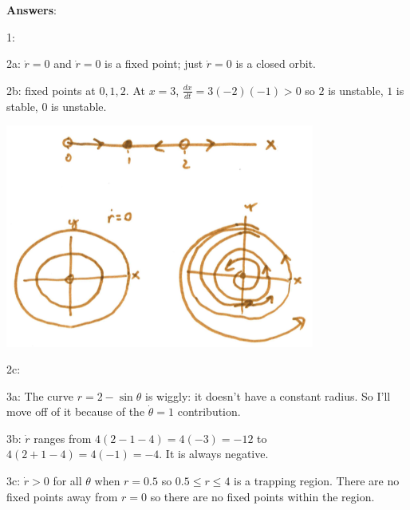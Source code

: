 \documentclass[12pt,letterpaper,noanswers]{exam}
\begin{document}
\eject
\textbf{Answers}:




1: %


2a: $\dot{r} = 0$ and $\dot{r} = 0$ is a fixed point; just $\dot{r} = 0$ is a closed orbit.

2b: fixed points at $0, 1, 2$.  At $x=3$, $\frac{dx}{dt} = 3(-2)(-1) > 0$ so $2$ is unstable, $1$ is stable, $0$ is unstable.  

\includegraphics[width=4in]{img/S19C13p2.png}

2c: 

3a: The curve $r = 2-\sin\theta$ is wiggly: it doesn't have a constant radius.  So I'll move off of it because of the $\dot\theta = 1$ contribution.

3b: $\dot r$ ranges from $4(2-1-4)=4(-3)=-12$ to $4(2+1-4)=4(-1)=-4$.  It is always negative.

3c: $\dot r>0$ for all $\theta$ when $r = 0.5$ so $0.5\leq r\leq 4$ is a trapping region.  There are no fixed points away from $r=0$ so there are no fixed points within the region.
\end{document}
